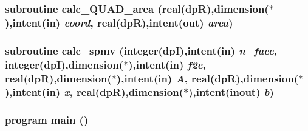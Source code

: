 \label{build_2mpicxxOptInt64_2test_2ftest_8f90_aedcabc3101935ffa79dac989cdf8cf09}
\hypertarget{build_2mpicxxOptInt64_2test_2ftest_8f90_a638fb93022b93255d8000bacff09a674}{
\subsubsection[{calc\_\-QUAD\_\-area}]{\setlength{\rightskip}{0pt plus 5cm}subroutine calc\_\-QUAD\_\-area (real(dpR),dimension($\ast$),intent(in) {\em coord}, \/  real(dpR),intent(out) {\em area})}}
\label{build_2mpicxxOptInt64_2test_2ftest_8f90_a638fb93022b93255d8000bacff09a674}
\hypertarget{build_2mpicxxOptInt64_2test_2ftest_8f90_a5595358e7ada913cd10a206235165422}{
\subsubsection[{calc\_\-spmv}]{\setlength{\rightskip}{0pt plus 5cm}subroutine calc\_\-spmv (integer(dpI),intent(in) {\em n\_\-face}, \/  integer(dpI),dimension($\ast$),intent(in) {\em f2c}, \/  real(dpR),dimension($\ast$),intent(in) {\em A}, \/  real(dpR),dimension($\ast$),intent(in) {\em x}, \/  real(dpR),dimension($\ast$),intent(inout) {\em b})}}
\label{build_2mpicxxOptInt64_2test_2ftest_8f90_a5595358e7ada913cd10a206235165422}
\hypertarget{build_2mpicxxOptInt64_2test_2ftest_8f90_a8ec2266d83cd6c0b762cbcbc92c0af3d}{
\subsubsection[{main}]{\setlength{\rightskip}{0pt plus 5cm}program main ()}}
\label{build_2mpicxxOptInt64_2test_2ftest_8f90_a8ec2266d83cd6c0b762cbcbc92c0af3d}

